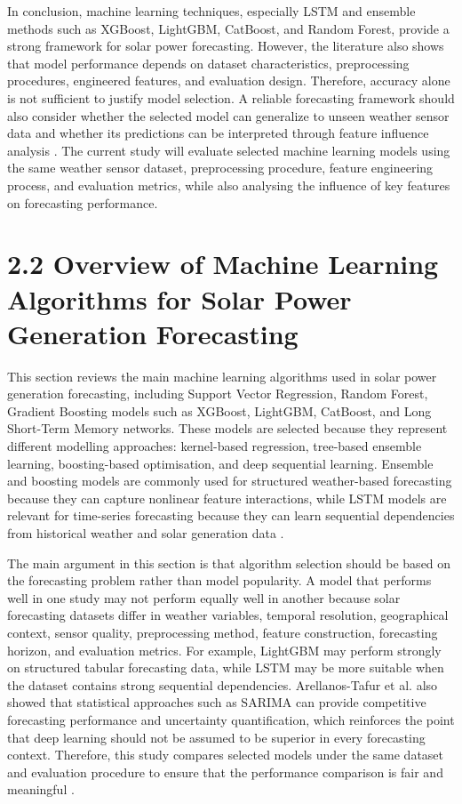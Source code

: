 In conclusion, machine learning techniques, especially LSTM and ensemble methods such as XGBoost, LightGBM, CatBoost, and Random Forest, provide a strong framework for solar power forecasting. However, the literature also shows that model performance depends on dataset characteristics, preprocessing procedures, engineered features, and evaluation design. Therefore, accuracy alone is not sufficient to justify model selection. A reliable forecasting framework should also consider whether the selected model can generalize to unseen weather sensor data and whether its predictions can be interpreted through feature influence analysis \parencite{ArellanosTafur2025, Eren2025, Ma2025}. The current study will evaluate selected machine learning models using the same weather sensor dataset, preprocessing procedure, feature engineering process, and evaluation metrics, while also analysing the influence of key features on forecasting performance.

\section{2.2 Overview of Machine Learning Algorithms for Solar Power Generation Forecasting}

This section reviews the main machine learning algorithms used in solar power generation forecasting, including Support Vector Regression, Random Forest, Gradient Boosting models such as XGBoost, LightGBM, CatBoost, and Long Short-Term Memory networks. These models are selected because they represent different modelling approaches: kernel-based regression, tree-based ensemble learning, boosting-based optimisation, and deep sequential learning. Ensemble and boosting models are commonly used for structured weather-based forecasting because they can capture nonlinear feature interactions, while LSTM models are relevant for time-series forecasting because they can learn sequential dependencies from historical weather and solar generation data \parencite{JnanaVarshitha2025, Bakht2025, Alhassan2025, Eren2025, TsaiLo2025, Duvuru2026}.

The main argument in this section is that algorithm selection should be based on the forecasting problem rather than model popularity. A model that performs well in one study may not perform equally well in another because solar forecasting datasets differ in weather variables, temporal resolution, geographical context, sensor quality, preprocessing method, feature construction, forecasting horizon, and evaluation metrics. For example, LightGBM may perform strongly on structured tabular forecasting data, while LSTM may be more suitable when the dataset contains strong sequential dependencies. Arellanos-Tafur et al. also showed that statistical approaches such as SARIMA can provide competitive forecasting performance and uncertainty quantification, which reinforces the point that deep learning should not be assumed to be superior in every forecasting context. Therefore, this study compares selected models under the same dataset and evaluation procedure to ensure that the performance comparison is fair and meaningful \parencite{ArellanosTafur2025, TsaiLo2025, CarvalhoJunior2025}.

